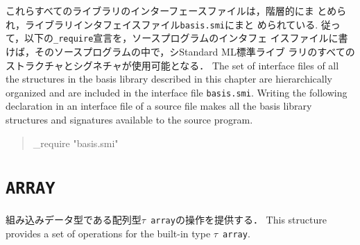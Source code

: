 \documentclass{jbook}
\newcommand{\code}[1]{\mbox{\large\tt #1}}
\newenvironment{program}{\begin{quote}\begin{tt}}%
                        {\end{tt}\end{quote}}
\newcommand{\signature}[2]{
\section{{\tt #1}}\label{section:reference:#2}
}
\begin{document}
\begin{center}
\begin{tabular}{ll|l|l}
\hline
\end{tabular}
\end{center}

\ifjp%
	これらすべてのライブラリのインターフェースファイルは，階層的にま
とめられ，ライブラリインタフェイスファイル\code{basis.smi}にまと
められている.
	従って，以下の{\tt \_require}宣言を，ソースプログラムのインタフェ
イスファイルに書けば，そのソースプログラムの中で，シStandard ML標準ライブ
ラリのすべてのストラクチャとシグネチャが使用可能となる．
\else%
	The set of interface files of all the structures in the basis
library described in this chapter are hierarchically organized and
are included in the interface file \code{basis.smi}.
	Writing the following declaration in an interface file of a
source file makes all the basis library structures and signatures
available to the source program.
\fi%

\begin{program}
\_require "basis.smi"
\end{program}

\signature{ARRAY}{ARRAY}
\ifjp%
	組み込みデータ型である配列型\code{$\tau$ array}の操作を提供する．
\else%
	This structure provides a set of operations for the built-in type
\code{$\tau$ array}.
\fi%
\end{document}
